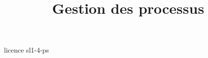 \documentclass [xcolor=table] {beamer}
\title {Gestion des processus}
\begin{document}
 {licence}
 {sl1-4-ps}
\end{document}
